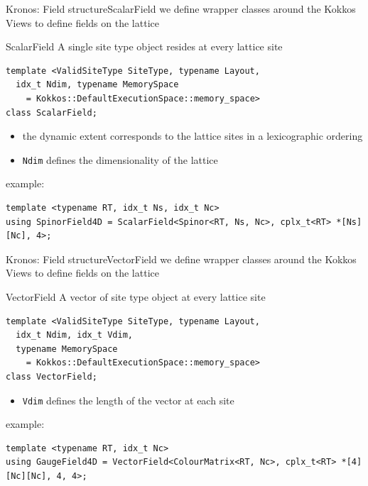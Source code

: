 \begin{frame}[fragile]{Kronos: Field structure}{ScalarField}
  we define wrapper classes around the Kokkos Views to
  define fields on the lattice\\

  \begin{block}{ScalarField}
    A single site type object resides at
    every lattice site
  \end{block}

  \begin{verbatim}
template <ValidSiteType SiteType, typename Layout,
  idx_t Ndim, typename MemorySpace 
    = Kokkos::DefaultExecutionSpace::memory_space>
class ScalarField;
  \end{verbatim}

  \begin{itemize}
    \item the dynamic extent corresponds to the lattice sites in a lexicographic ordering
    \item \verb|Ndim| defines the dimensionality of the lattice
  \end{itemize}

  example:

  \begin{verbatim}
template <typename RT, idx_t Ns, idx_t Nc>
using SpinorField4D = ScalarField<Spinor<RT, Ns, Nc>, cplx_t<RT> *[Ns][Nc], 4>;
  \end{verbatim}

\end{frame}

\begin{frame}[fragile]{Kronos: Field structure}{VectorField}
  we define wrapper classes around the Kokkos Views to
  define fields on the lattice\\

  \begin{block}{VectorField}
    A vector of site type object at
    every lattice site
  \end{block}

  \begin{verbatim}
template <ValidSiteType SiteType, typename Layout,
  idx_t Ndim, idx_t Vdim,
  typename MemorySpace 
    = Kokkos::DefaultExecutionSpace::memory_space>
class VectorField;
  \end{verbatim}

  \begin{itemize}
    \item \verb|Vdim| defines the length of the vector at each site
  \end{itemize}

  example:

  \begin{verbatim}
template <typename RT, idx_t Nc>
using GaugeField4D = VectorField<ColourMatrix<RT, Nc>, cplx_t<RT> *[4][Nc][Nc], 4, 4>;
  \end{verbatim}

\end{frame}

